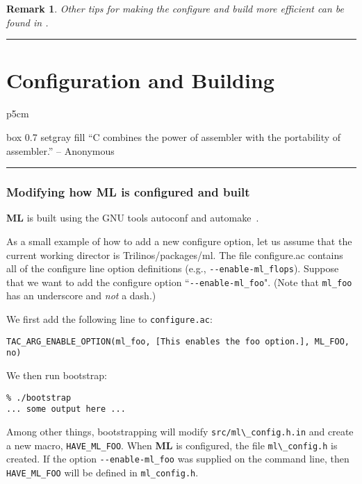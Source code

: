 \documentclass[10pt,letter,relax]{SANDreport}
\newtheorem{remark}{Remark}
\newcommand{\HRule}{\noindent\rule{\linewidth}{1mm}}
\newcommand{\ML}     {{\bf ML }}
\begin{document}
\begin{remark}
  Other tips for making the configure and build more efficient can
  be found in \cite[Section 2.6]{Trilinos-Dev-Guide}.
\end{remark}


\clearpage
\newpage

\vspace*{3cm}
\HRule
\part{Configuration and Building}

\medskip

\hfill
\begin{tabular}{p{5cm}}
\begin{boxitpara}{box 0.7 setgray fill}
``C combines the power of assembler with the portability of assembler.''
                                 -- Anonymous
\end{boxitpara}
\end{tabular}

\HRule
\clearpage
\newpage


\section{Modifying how \ML is configured and built}
\label{sec:configure}

\ML is built using the GNU tools autoconf and automake~\cite{Autoconf,Automake}.

As a small example of how to add a new configure option, let us 
assume that the current working director is Trilinos/packages/ml.
The file configure.ac contains all of the configure line option definitions
(e.g., \verb!--enable-ml_flops!).   Suppose that we want to add the configure option
``\verb!--enable-ml_foo!". (Note that \verb!ml_foo! has an underscore
and {\sl not} a dash.)

We first add the following line to \verb!configure.ac!:
\begin{verbatim}
TAC_ARG_ENABLE_OPTION(ml_foo, [This enables the foo option.], ML_FOO, no)
\end{verbatim}
We then run bootstrap:
\begin{verbatim}
% ./bootstrap
... some output here ...
\end{verbatim}
Among other things, bootstrapping  will modify
\verb!src/ml\_config.h.in! and create a new macro, \verb!HAVE_ML_FOO!.
When \ML is configured, the file \verb!ml\_config.h! is created.
If the option \verb!--enable-ml_foo! was supplied on the command line, then
\verb!HAVE_ML_FOO! will be defined in \verb!ml_config.h!.
\end{document}
